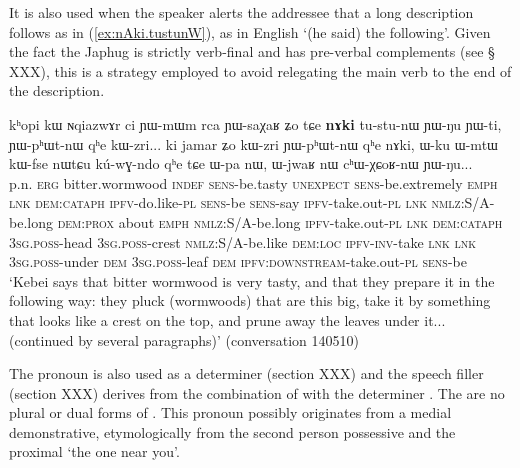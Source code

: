 It is also used  when the speaker alerts the addressee that a long description follows as in (\ref{ex:nAki.tustunW}), as in English `(he said) the following'. Given the fact the Japhug is strictly verb-final and has pre-verbal complements (see § XXX), this is a strategy employed to avoid relegating the main verb to the end of the description.

 \begin{exe}
\ex \label{ex:nAki.tustunW}
 \gll
kʰopi kɯ ɴqiazwɤr ci ɲɯ-mɯm rca ɲɯ-saχaʁ ʑo tɕe \textbf{nɤki} tu-stu-nɯ ɲɯ-ŋu ɲɯ-ti, ɲɯ-pʰɯt-nɯ qʰe kɯ-zri... ki jamar ʑo kɯ-zri ɲɯ-pʰɯt-nɯ qʰe nɤki, ɯ-ku ɯ-mtɯ kɯ-fse nɯtɕu kú-wɣ-ndo qʰe tɕe ɯ-pa nɯ, ɯ-jwaʁ nɯ cʰɯ-χɕoʁ-nɯ ɲɯ-ŋu...  \\
p.n. \textsc{erg} bitter.wormwood \textsc{indef} \textsc{sens}-be.tasty \textsc{unexpect} \textsc{sens}-be.extremely \textsc{emph} \textsc{lnk} \textsc{dem:cataph} \textsc{ipfv}-do.like-\textsc{pl} \textsc{sens}-be \textsc{sens}-say \textsc{ipfv}-take.out-\textsc{pl} \textsc{lnk} \textsc{nmlz}:S/A-be.long \textsc{dem:prox} about \textsc{emph} \textsc{nmlz}:S/A-be.long \textsc{ipfv}-take.out-\textsc{pl} \textsc{lnk} \textsc{dem:cataph} \textsc{3sg.poss}-head  \textsc{3sg.poss}-crest \textsc{nmlz}:S/A-be.like  \textsc{dem:loc} \textsc{ipfv-inv}-take \textsc{lnk} \textsc{lnk} \textsc{3sg.poss}-under \textsc{dem}  \textsc{3sg.poss}-leaf \textsc{dem} \textsc{ipfv:downstream}-take.out-\textsc{pl}  \textsc{sens}-be \\
\glt `Kebei says that bitter wormwood is very tasty, and that they prepare it in the following way: they pluck (wormwoods) that are this big, take it by something that looks like a crest on the top, and prune away the leaves under it... (continued by several paragraphs)' (conversation 140510)
\end{exe}

The pronoun  is also used as a determiner (section XXX) and the speech filler  (section XXX) derives from the combination of    with the determiner . The are no plural or dual forms of . This pronoun possibly originates from a medial demonstrative, etymologically from the second person possessive  and the proximal  `the one near you'.
